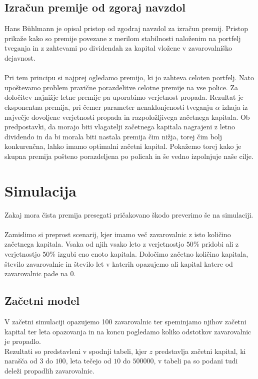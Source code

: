 \documentclass[a4paper,12pt]{homework}
\begin{document}
	\subsection{Izračun premije od zgoraj navzdol}
	Hans Bühlmann je opisal pristop od zgodraj navzdol za izračun premij. Pristop prikaže kako so premije povezane z merilom stabilnosti naloženim na portfelj tveganja in z zahtevami po dividendah za kapital vložene v zavarovalniško dejavnost.
	\\
	\\
	Pri tem principu si najprej ogledamo premijo, ki jo zahteva celoten portfelj. Nato upoštevamo problem pravične porazdelitve celotne premije na vse police. Za določitev najnižje letne premije pa uporabimo verjetnost propada. Rezultat je eksponentna premija, pri čemer parameter nenaklonjenosti tveganju $\alpha$  izhaja iz največje dovoljene verjetnosti propada in razpoložljivega začetnega kapitala. Ob predpostavki, da morajo biti vlagatelji začetnega kapitala nagrajeni z letno dividendo in da bi morala biti nastala premija čim nižja, torej čim bolj konkurenčna, lahko imamo optimalni začetni kapital. Pokažemo torej kako je skupna premija pošteno porazdeljena po policah in še vedno izpolnjuje naše cilje.
	
	\section{Simulacija}
	Zakaj mora čista premija presegati pričakovano škodo preverimo še na simulaciji. 
	\\
	\\
	Zamislimo si preprost scenarij, kjer imamo več zavarovalnic z isto količino začetnega kapitala. Vsaka od njih vsako leto z verjetnostjo $50 \%$ pridobi ali z verjetnostjo $50 \%$ izgubi eno enoto kapitala. Določimo začetno količino kapitala, število zavarovalnic in število let v katerih opazujemo ali kapital katere od zavarovalnic pade na 0.
	
	\subsection{Začetni model}
	V začetni simulaciji opazujemo 100 zavarovalnic ter speminjamo njihov začetni kapital ter leta opazovanja in na koncu pogledamo koliko odstotkov zavarovalnic je propadlo. 
	\\ Rezultati so predstavleni v spodnji tabeli, kjer $z$ predstavlja začetni kapital, ki narašča od $3$ do $100$, leta tečejo od $10$ do $500000$, v tabeli pa so podani tudi deleži propadlih zavarovalnic.
	
\end{document}
